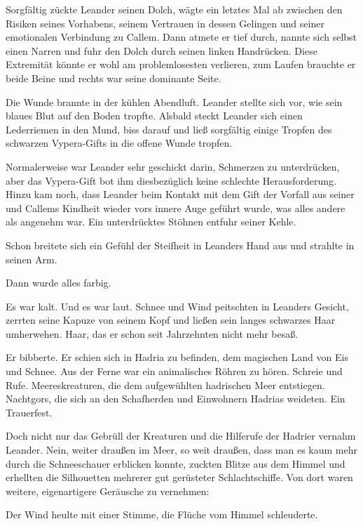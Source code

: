 \documentclass[10pt, a4paper, oneside]{book}
\begin{document}
Sorgfältig zückte Leander seinen Dolch, wägte ein letztes Mal ab zwischen den Risiken seines Vorhabens, seinem Vertrauen in dessen Gelingen und seiner emotionalen Verbindung zu Callem. Dann atmete er tief durch, nannte sich selbst einen Narren und fuhr den Dolch durch seinen linken Handrücken. Diese Extremität könnte er wohl am problemlosesten verlieren, zum Laufen brauchte er beide Beine und rechts war seine dominante Seite.

Die Wunde brannte in der kühlen Abendluft. Leander stellte sich vor, wie sein blaues Blut auf den Boden tropfte. Alsbald steckt Leander sich einen Lederriemen in den Mund, biss darauf und ließ sorgfältig einige Tropfen des schwarzen Vypera-Gifts in die offene Wunde tropfen.

Normalerweise war Leander sehr geschickt darin, Schmerzen zu unterdrücken, aber das Vypera-Gift bot ihm diesbezüglich keine schlechte Herausforderung. Hinzu kam noch, dass Leander beim Kontakt mit dem Gift der Vorfall aus seiner und Callems Kindheit wieder vors innere Auge geführt wurde, was alles andere als angenehm war. Ein unterdrücktes Stöhnen entfuhr seiner Kehle.

Schon breitete sich ein Gefühl der Steifheit in Leanders Hand aus und strahlte in seinen Arm.

Dann wurde alles farbig.\bigskip







Es war kalt. Und es war laut. Schnee und Wind peitschten in Leanders Gesicht, zerrten seine Kapuze von seinem Kopf und ließen sein langes schwarzes Haar umherwehen. Haar, das er schon seit Jahrzehnten nicht mehr besaß.

Er bibberte. Er schien sich in Hadria zu befinden, dem magischen Land von Eis und Schnee. Aus der Ferne war ein animalisches Röhren zu hören. Schreie und Rufe. Meereskreaturen, die dem aufgewühlten hadrischen Meer entstiegen. Nachtgors, die sich an den Schafherden und Einwohnern Hadrias weideten. Ein Trauerfest.

Doch nicht nur das Gebrüll der Kreaturen und die Hilferufe der Hadrier vernahm Leander. Nein, weiter draußen im Meer, so weit draußen, dass man es kaum mehr durch die Schneeschauer erblicken konnte, zuckten Blitze aus dem Himmel und erhellten die Silhouetten mehrerer gut gerüsteter Schlachtschiffe. Von dort waren weitere, eigenartigere Geräusche zu vernehmen:

Der Wind heulte mit einer Stimme, die Flüche vom Himmel schleuderte.
\end{document}
